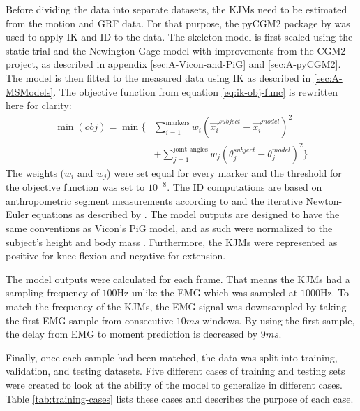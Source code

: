 \documentclass[../main.tex]{subfiles}
\begin{document}
Before dividing the data into separate datasets, the \acp{KJM} need to be estimated from the motion and \ac{GRF} data.
For that purpose, the pyCGM2 package by \textcite{Leboeuf2019} was used to apply \ac{IK} and \ac{ID} to the data.
The skeleton model is first scaled using the static trial and the Newington-Gage model with improvements from the CGM2 project, as described in appendix \ref{sec:A-Vicon-and-PiG} and \ref{sec:A-pyCGM2}.
The model is then fitted to the measured data using \ac{IK} as described in \ref{sec:A-MSModels}. 
The objective function from equation \ref{eq:ik-obj-func} is rewritten here for clarity:
\begin{align*}
    \min(obj) = \min\biggl\{ &\sum_{i=1}^{\text{markers}}w_i \left(\Vec{x_i}^{subject}-\Vec{x_i}^{model}\right)^2 \nonumber\\ 
    &+ \sum_{j=1}^{\text{joint angles}}w_j \left( \theta_j^{subject}-\theta_j^{model}\right)^2 \biggr\}
\end{align*}
The weights ($w_i$ and $w_j$) were set equal for every marker and the threshold for the objective function was set to $10^{-8}$.
The \ac{ID} computations are based on anthropometric segment measurements according to \textcite{Dempster1955} and the iterative Newton-Euler equations as described by \textcite{Dumas2004}.
The model outputs are designed to have the same conventions as Vicon's \ac{PiG} model, and as such were normalized to the subject's height and body mass \cite{Leboeuf2019, viconpig}.
Furthermore, the \acp{KJM} were represented as positive for knee flexion and negative for extension.

The model outputs were calculated for each frame.
That means the \acp{KJM} had a sampling frequency of $100$Hz unlike the \ac{EMG} which was sampled at $1000$Hz.
To match the frequency of the \acp{KJM}, the \ac{EMG} signal was downsampled by taking the first \ac{EMG} sample from consecutive $10ms$ windows.
By using the first sample, the delay from \ac{EMG} to moment prediction is decreased by $9ms$. 

Finally, once each sample had been matched, the data was split into training, validation, and testing datasets.
Five different cases of training and testing sets were created to look at the ability of the model to generalize in different cases.
Table \ref{tab:training-cases} lists these cases and describes the purpose of each case.

\end{document}

